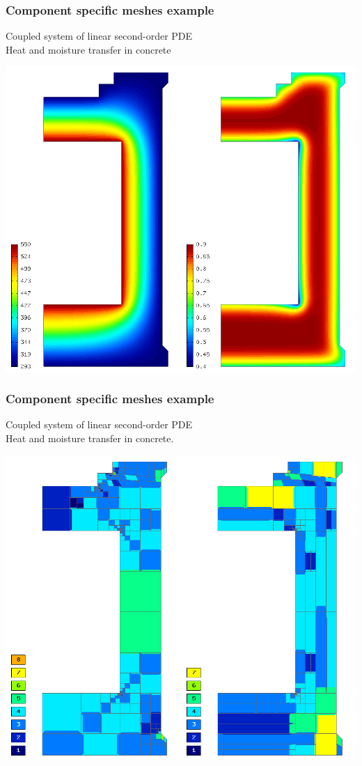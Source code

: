 \begin{frame}
 \frametitle{Component specific meshes example}
	Coupled system of linear second-order PDE\\
	Heat and moisture transfer in concrete
\begin{center}
\includegraphics[height=0.6\textheight]{hm-sln-frame.png}
\end{center} 
\end{frame}

\begin{frame}
 \frametitle{Component specific meshes example}
	Coupled system of linear second-order PDE\\
	Heat and moisture transfer in concrete.
\begin{center}
 \includegraphics[height=0.6\textheight]{hm-mesh-frame.png}
\end{center} 
\end{frame}
